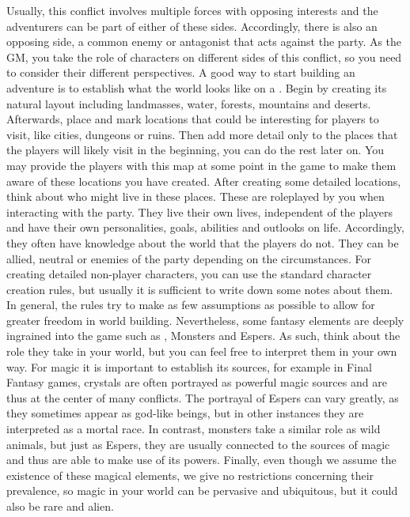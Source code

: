 Usually, this conflict involves multiple forces with opposing interests and the adventurers can be part of either of these sides.
Accordingly, there is also an opposing side, a common enemy or antagonist that acts against the party.
As the GM, you take the role of characters on different sides of this conflict, so you need to consider their different perspectives. 
%
\ofpar
%
A good way to start building an adventure is to establish what the world looks like on a . 
Begin by creating its natural layout including landmasses, water, forests, mountains and deserts. 
Afterwards, place and mark locations that could be interesting for players to visit, like cities, dungeons or ruins.
Then add more detail only to the places that the players will likely visit in the beginning, you can do the rest later on.
You may provide the players with this map at some point in the game to make them aware of these locations you have created.
After creating some detailed locations, think about who might live in these places.
These  are roleplayed by you when interacting with the party.
They live their own lives, independent of the players and have their own personalities, goals, abilities and outlooks on life. 
Accordingly, they often have knowledge about the world that the players do not.
They can be allied, neutral or enemies of the party depending on the circumstances.
For creating detailed non-player characters, you can use the standard character creation rules, but usually it is sufficient to write down some notes about them.
%
\ofpar
%
In general, the rules try to make as few assumptions as possible to allow for greater freedom in world building.
Nevertheless, some fantasy elements are deeply ingrained into the game such as , Monsters and Espers.
As such, think about the role they take in your world, but you can feel free to interpret them in your own way.
For magic it is important to establish its sources, for example in Final Fantasy games, crystals are often portrayed as powerful magic sources and are thus at the center of many conflicts.
The portrayal of Espers can vary greatly, as they sometimes appear as god-like beings, but in other instances they are interpreted as a mortal race.
In contrast, monsters take a similar role as wild animals, but just as Espers, they are usually connected to the sources of magic and thus are able to make use of its powers.
Finally, even though we assume the existence of these magical elements, we give no restrictions concerning their prevalence, so magic in your world can be pervasive and ubiquitous, but it could also be rare and alien.

